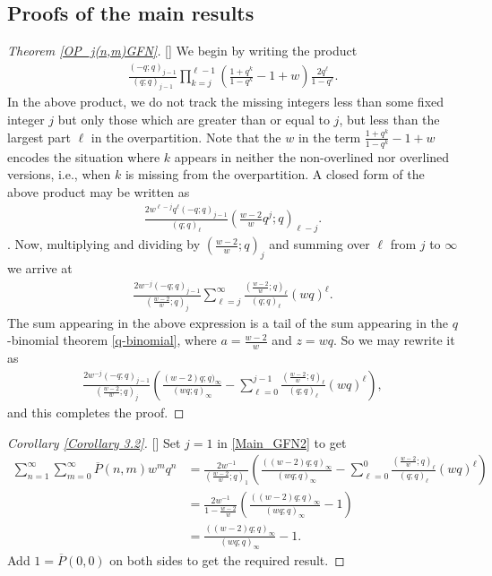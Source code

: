 \documentclass[12pt,reqno]{amsart}
\renewcommand{\(}{\left\(}
\renewcommand{\)}{\right\)}
\renewcommand{\[}{\left\[}
\renewcommand{\]}{\right\]}
\numberwithin{equation}{section}
\theoremstyle{plain}
\begin{document}
\subsection{Proofs of the main results}
\begin{proof}[Theorem \textup{\ref{OP_j(n,m)GFN}}][]
We begin by writing the product 
\begin{align*}
\frac{(-q;q)_{j-1}}{(q;q)_{j-1}}\prod_{k=j}^{\ell-1}\left(\frac{1+q^k}{1-q^k}-1+w \right)\frac{2q^\ell}{1-q^\ell}.
\end{align*}
In the above product, we do not track the missing integers less than some fixed integer $j$ but only those which are greater than or equal to $j$, but less than the largest part $\ell$ in the overpartition. Note that the $w$ in the term $\frac{1+q^k}{1-q^k}-1+w$ encodes the situation where $k$ appears in neither the non-overlined nor overlined versions, i.e., when $k$ is missing from the overpartition. A closed form of the above product may be written as
\begin{align*}
\frac{2w^{\ell-j}q^\ell(-q;q)_{j-1}}{(q;q)_{\ell}}\left(\frac{w-2}{w}q^j;q\right)_{\ell-j}.
\end{align*}.
Now, multiplying and dividing by $(\frac{w-2}{w};q)_j$ and summing over $\ell$ from $j$ to $\infty$ we arrive at 
\begin{align*}
\frac{2w^{-j}(-q;q)_{j-1}}{(\frac{w-2}{w};q)_j}\sum_{\ell=j}^{\infty}\frac{(\frac{w-2}{w};q)_{\ell}}{(q;q)_{\ell}}(wq)^{\ell}.
\end{align*}
The sum appearing in the above expression is a tail of the sum appearing in the $q$-binomial theorem \eqref{q-binomial}, where $a=\frac{w-2}{w}$ and $z=wq$. So we may rewrite it as 
\begin{align*}
\frac{2w^{-j}(-q;q)_{j-1}}{(\frac{w-2}{w};q)_j}\left(\frac{(w-2)q;q)_{\infty}}{(wq;q)_{\infty}}-\sum_{\ell=0}^{j-1}\frac{(\frac{w-2}{w};q)_{\ell}}{(q;q)_\ell}(wq)^\ell\right),
\end{align*} 
and this completes the proof.
\end{proof}
\begin{proof}[Corollary \textup{\ref{Corollary 3.2}}][]
Set $j=1$ in \eqref{Main_GFN2} to get
\begin{align*}
\sum_{n=1}^{\infty}\sum_{m=0}^{\infty} \overline{P}(n,m)w^mq^n &=\frac{2w^{-1}}{(\frac{w-2}{w};q)_1}\left(\frac{((w-2)q;q)_{\infty}}{(wq;q)_{\infty}}-\sum_{\ell=0}^{0}\frac{(\frac{w-2}{w};q)_{\ell}}{(q;q)_\ell}(wq)^\ell\right) \\
&= \frac{2w^{-1}}{1 - \frac{w-2}{w}} \left(\frac{((w-2)q;q)_{\infty}}{(wq;q)_{\infty}} - 1 \right)  \\
&= \frac{((w-2)q;q)_{\infty}}{(wq;q)_{\infty}} - 1.
\end{align*}
Add $1 = \overline{P}(0, 0)$ on both sides to get the required result.
\end{proof}
\end{document}
